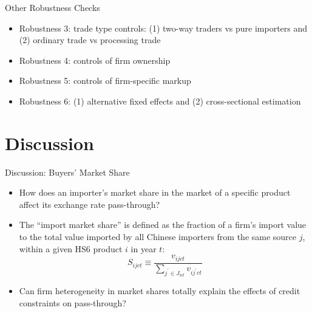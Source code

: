 \documentclass[10pt]{beamer}
\begin{document}
\begin{frame}[label=robustness_other]{Other Robustness Checks}
    \begin{itemize}
	\item Robustness 3: trade type controls: (1) two-way traders vs pure importers and (2) ordinary trade vs processing trade \hyperlink{tab.robust.tradetype}{}
        \vfill
        \item Robustness 4: controls of firm ownership \hyperlink{tab.robust.ownership}{}
        \vfill
        \item Robustness 5: controls of firm-specific markup \hyperlink{tab.markup}{}
        \vfill
        \item Robustness 6: (1) alternative fixed effects \hyperlink{tab.robust.fe}{} and (2) cross-sectional estimation \hyperlink{tab.robust.crosec}{}
    \end{itemize}
\end{frame}

\section{Discussion}

\begin{frame}{Discussion: Buyers' Market Share}
    \begin{itemize}
	\item How does an importer's market share in the market of a specific product affect its exchange rate pass-through?
        \item The ``import market share'' is defined as the fraction of a firm's import value to the total value imported by all Chinese importers from the same source $j$, within a given HS6 product $i$ in  year $t$:
        $$
        S_{ijct} \equiv \frac{v_{ijct}}{\sum_{j^{\prime} \in J_{ict}} v_{ij^{\prime}ct}}
        $$
        \item Can firm heterogeneity in market shares totally explain the effects of credit constraints on pass-through?
	\end{itemize}
\end{frame}
\end{document}
